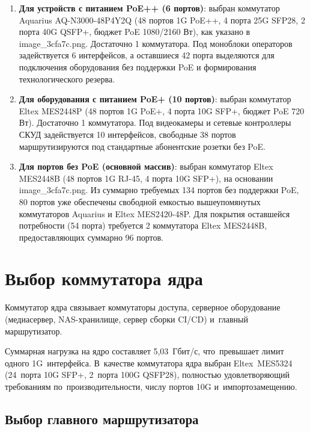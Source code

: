 \documentclass[a4paper,oneside,14pt]{extreport}
\begin{document}
\begin{enumerate}
    \item \textbf{Для устройств с питанием PoE++ (6 портов)}: выбран коммутатор Aquarius AQ-N3000-48P4Y2Q (48 портов 1G PoE++, 4 порта 25G SFP28, 2 порта 40G QSFP+, бюджет PoE 1080/2160 Вт), как указано в image\_3cfa7c.png. Достаточно 1 коммутатора. Под моноблоки операторов задействуется 6 интерфейсов, а оставшиеся 42 порта выделяются для подключения оборудования без поддержки PoE и формирования технологического резерва.
    \item \textbf{Для оборудования с питанием PoE+ (10 портов)}: выбран коммутатор Eltex MES2448P (48 портов 1G PoE+, 4 порта 10G SFP+, бюджет PoE 720 Вт). Достаточно 1 коммутатора. Под видеокамеры и сетевые контроллеры СКУД задействуется 10 интерфейсов, свободные 38 портов маршрутизируются под стандартные абонентские розетки без PoE.
    \item \textbf{Для портов без PoE (основной массив)}: выбран коммутатор Eltex MES2448B (48 портов 1G RJ-45, 4 порта 10G SFP+), на основании image\_3cfa7c.png. Из суммарно требуемых 134 портов без поддержки PoE, 80 портов уже обеспечены свободной емкостью вышеупомянутых коммутаторов Aquarius и Eltex MES2420-48P. Для покрытия оставшейся потребности (54 порта) требуется 2 коммутатора Eltex MES2448B, предоставляющих суммарно 96 портов.
\end{enumerate}

\section{Выбор коммутатора ядра}

Коммутатор ядра связывает коммутаторы доступа, серверное оборудование (медиасервер, NAS-хранилище, сервер сборки CI/CD) и~главный маршрутизатор.

Суммарная нагрузка на ядро составляет 5,03~Гбит/с, что~превышает лимит одного 1G~интерфейса. В~качестве коммутатора ядра выбран Eltex~MES5324 (24~порта 10G SFP+, 2~порта 100G QSFP28), полностью удовлетворяющий требованиям по~производительности, числу портов 10G и~импортозамещению.





\subsection{Выбор главного маршрутизатора}
\end{document}
